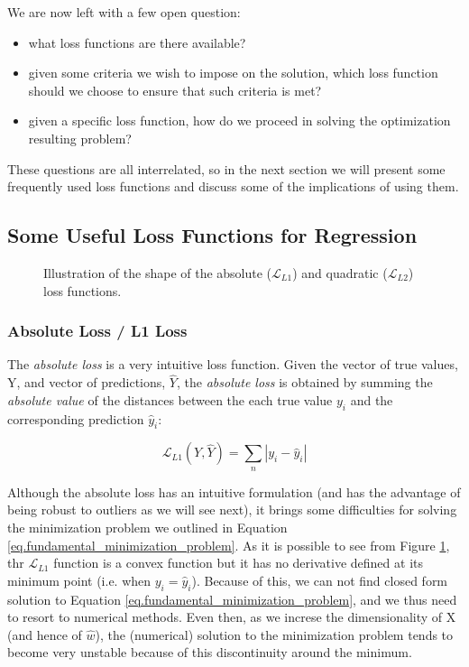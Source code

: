 We are now left with a few open question:
\begin{itemize}
\item what loss functions are there available?
\item given some criteria we wish to impose on the solution, which loss function should we choose to ensure that such criteria is met? 
\item given a specific loss function, how do we proceed in solving the optimization resulting problem?
\end{itemize}
These questions are all interrelated, so in the next section we will present some frequently used loss functions and discuss some of the implications of using them.

\subsection{Some Useful Loss Functions for Regression}
\label{section_loss_functions}
\begin {figure}[H]
\begin{center}
  
\end{center}
\caption{Illustration of the shape of the absolute ($\mathcal{L}_{L1}$) and quadratic ($\mathcal{L}_{L2}$) loss functions.}
\label{fig.loss_functions}
\end {figure}

\subsubsection{Absolute Loss / L1 Loss}
The \emph{absolute loss} is a very intuitive loss function. Given the vector of true values, Y, and vector of predictions, $\hat{Y}$, the \emph{absolute loss} is obtained by summing the \emph{absolute value} of the distances between the each true value $y_i$ and the corresponding prediction $\hat{y}_i$:

\begin{equation}
\mathcal{L}_{L1}(Y, \hat{Y}) = \sum_n | y_i - \hat{y}_i |
\end{equation}

Although the absolute loss has an intuitive formulation (and has the advantage of being robust to outliers as we will see  next), it brings some difficulties for solving the minimization problem we outlined in Equation \ref{eq.fundamental_minimization_problem}. As it is possible to see from Figure \ref{fig.loss_functions}, thr $\mathcal{L}_{L1}$ function is a convex function but it has no derivative defined at its minimum point (i.e. when $ y_i = \hat{y}_i$). Because of this, we can not find closed form solution to Equation \ref{eq.fundamental_minimization_problem}, and we thus need to resort to numerical methods. Even then, as we increse the dimensionality of X (and hence of $\hat{w}$), the (numerical) solution to the minimization problem tends to become very unstable because of this discontinuity around the minimum.

